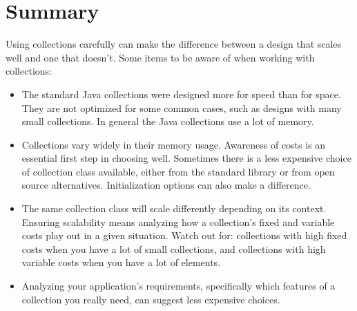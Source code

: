 
\section{Summary}
Using collections carefully can
make the difference between a design that scales well and one that
doesn't. Some items to be aware of when working with collections:
\begin{itemize}
  \item The standard Java collections were designed more for speed than for
  space. They are not optimized for some common cases, such as designs with many small
  collections. In general the Java collections use a lot of memory.
  \item Collections vary widely in their memory usage. Awareness of
  costs is an essential first step in choosing well. Sometimes there is a less
  expensive choice of collection class available, either from the standard
  library or from open source alternatives. Initialization options can also make
  a difference.
  \item The same collection class will scale differently depending on its
  context. Ensuring scalability means
  analyzing how a collection's fixed and variable costs
  play out in a given situation. Watch out for: collections with
  high fixed costs when you have a lot of small collections, and 
  collections with high variable costs when you have a
  lot of elements.
  \item Analyzing your application's requirements, specifically
  which features of a collection you really need, can suggest
  less expensive choices.
\end{itemize}
